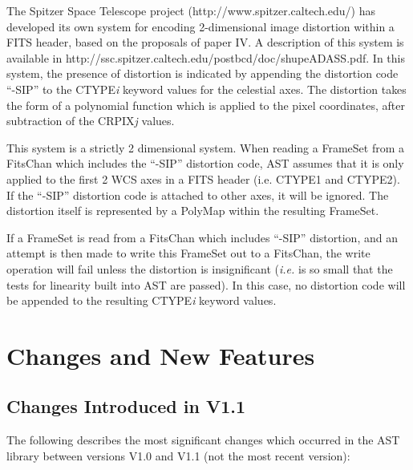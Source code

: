 \documentclass[twoside,11pt]{article}
\newcommand{\htmladdnormallink}[2]{#1}
\newcommand{\xlabel}[1]{}
\begin{document}
The Spitzer Space Telescope project
(\htmladdnormallink{http://www.spitzer.caltech.edu/}{http://www.spitzer.caltech.edu/})
has developed its own system for encoding 2-dimensional image distortion
within a FITS header, based on the proposals of paper IV. A description
of this system is available in \htmladdnormallink
{http://ssc.spitzer.caltech.edu/postbcd/doc/shupeADASS.pdf}
{http://ssc.spitzer.caltech.edu/postbcd/doc/shupeADASS.pdf}. In this
system, the presence of distortion is indicated by appending the
distortion code ``-SIP'' to the CTYPE\emph{i} keyword values for the
celestial axes. The distortion takes the form of a polynomial function
which is applied to the pixel coordinates, after subtraction of the
CRPIX\emph{j} values.

This system is a strictly 2 dimensional system. When reading a
FrameSet from a FitsChan which
includes the ``-SIP'' distortion code, AST assumes that it
is only applied to the first 2 WCS axes in a FITS header (i.e.
CTYPE1 and CTYPE2). If the ``-SIP'' distortion code is attached to other
axes, it will be ignored. The distortion itself is represented by a
PolyMap within the resulting FrameSet.

If a FrameSet is read from a FitsChan which includes ``-SIP''
distortion, and an attempt is then made to write this FrameSet out to a
FitsChan, the write operation will fail unless the distortion is
insignificant (\emph{i.e.} is so small that the tests for linearity built
into AST are passed). In this case, no distortion code will be appended to
the resulting CTYPE\emph{i} keyword values.

\newpage
\section{\xlabel{changes_and_new_features}\label{ss:changes}Changes and New Features}

\subsection{Changes Introduced in V1.1}

The following describes the most significant changes which occurred in
the AST library between versions V1.0 and V1.1 (not the most recent
version):
\end{document}
